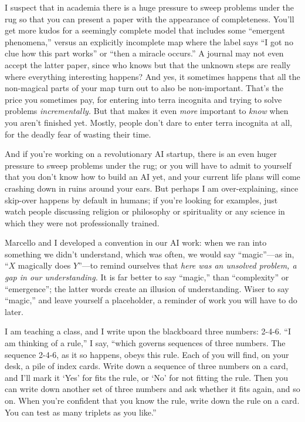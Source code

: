 {
 I suspect that in academia there is a huge pressure to sweep
problems under the rug so that you can present a paper with the
appearance of completeness. You'll get more kudos for a
seemingly complete model that includes some ``emergent
phenomena,'' versus an explicitly incomplete map
where the label says ``I got no clue how this part
works'' or ``then a miracle
occurs.'' A journal may not even accept the latter
paper, since who knows but that the unknown steps are really where
everything interesting happens? And yes, it sometimes happens that all
the non-magical parts of your map turn out to also be non-important.
That's the price you sometimes pay, for entering into
terra incognita and trying to solve problems \textit{incrementally.}
But that makes it even \textit{more} important to \textit{know} when
you aren't finished yet. Mostly, people
don't dare to enter terra incognita at all, for the
deadly fear of wasting their time.}

{
 And if you're working on a revolutionary AI
startup, there is an even huger pressure to sweep problems under the
rug; or you will have to admit to yourself that you
don't know how to build an AI yet, and your current
life plans will come crashing down in ruins around your ears. But
perhaps I am over-explaining, since skip-over happens by default in
humans; if you're looking for examples, just watch
people discussing religion or philosophy or spirituality or any science
in which they were not professionally trained.}

{
 Marcello and I developed a convention in our AI work: when we ran
into something we didn't understand, which was often,
we would say ``magic''---as in,
``$X$ magically does $Y$''---to remind
ourselves that \textit{here was an unsolved problem, a gap in our
understanding.} It is far better to say
``magic,'' than
``complexity'' or
``emergence''; the latter words
create an illusion of understanding. Wiser to say
``magic,'' and leave yourself a
placeholder, a reminder of work you will have to do later.}

\myendsectiontext


{
 I am teaching a class, and I write upon the blackboard three
numbers: 2-4-6. ``I am thinking of a
rule,'' I say, ``which governs
sequences of three numbers. The sequence 2-4-6, as it so happens, obeys
this rule. Each of you will find, on your desk, a pile of index cards.
Write down a sequence of three numbers on a card, and
I'll mark it `Yes' for
fits the rule, or `No' for not fitting
the rule. Then you can write down another set of three numbers and ask
whether it fits again, and so on. When you're confident
that you know the rule, write down the rule on a card. You can test as
many triplets as you like.'' }


